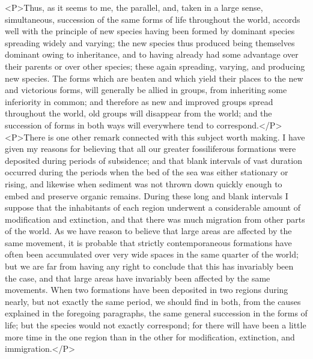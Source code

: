 <P>Thus, as it seems to me, the parallel, and, taken in a large sense, simultaneous, succession of the same forms of life throughout the world, accords well with the principle of new species having been formed by dominant species spreading widely and varying; the new species thus produced being themselves dominant owing to inheritance, and to having already had some advantage over their parents or over other species; these again spreading, varying, and producing new species. The forms which are beaten and which yield their places to the new and victorious forms, will generally be allied in groups, from inheriting some inferiority in common; and therefore as new and improved groups spread throughout the world, old groups will disappear from the world; and the succession of forms in both ways will everywhere tend to correspond.</P>
<P>There is one other remark connected with this subject worth making.  I have given my reasons for believing that all our greater fossiliferous formations were deposited during periods of subsidence; and that blank intervals of vast duration occurred during the periods when the bed of the sea was either stationary or rising, and likewise when sediment was not thrown down quickly enough to embed and preserve organic remains. During these long and blank intervals I suppose that the inhabitants of each region underwent a considerable amount of modification and extinction, and that there was much migration from other parts of the world. As we have reason to believe that large areas are affected by the same movement, it is probable that strictly contemporaneous formations have often been accumulated over very wide spaces in the same quarter of the world; but we are far from having any right to conclude that this has invariably been the case, and that large areas have invariably been affected by the same movements. When two formations have been deposited in two regions during nearly, but not exactly the same period, we should find in both, from the causes explained in the foregoing paragraphs, the same general succession in the forms of life; but the species would not exactly correspond; for there will have been a little more time in the one region than in the other for modification, extinction, and immigration.</P>
